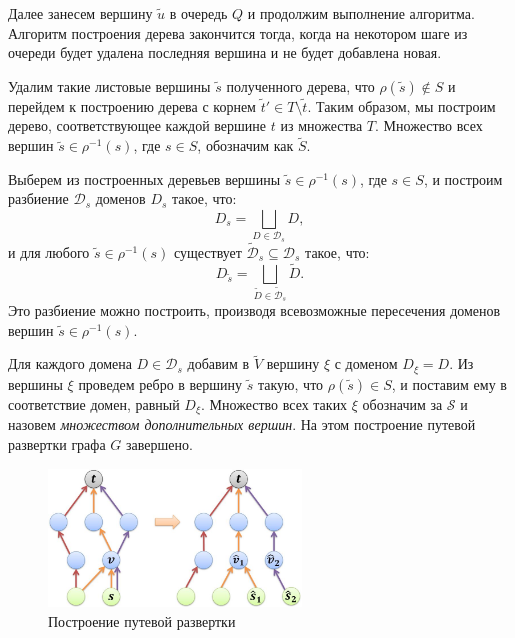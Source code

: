 \documentclass[../thesis.tex]{subfiles}
\begin{document}
Далее занесем вершину $\tilde{u}$ в очередь $Q$ и продолжим выполнение алгоритма.
Алгоритм построения дерева закончится тогда, когда на некотором шаге из очереди будет удалена последняя вершина и не будет добавлена новая.

Удалим такие листовые вершины $\tilde{s}$ полученного дерева, что $\rho(\tilde{s})\notin S$ и перейдем к построению дерева с корнем $\tilde{t}'\in T\setminus{\tilde{t}}$.
Таким образом, мы построим дерево, соответствующее каждой вершине $t$ из множества $T$.
Множество всех вершин $\tilde{s}\in \rho^{-1}(s)$, где $s\in S$, обозначим как $\widetilde{S}$.

Выберем из построенных деревьев вершины $\tilde{s}\in \rho^{-1}(s)$, где $s\in S$, и построим разбиение $\mathscr{D}_s$ доменов $D_s$ такое, что:
\begin{equation}
    D_s = \bigsqcup_{D\in \mathscr{D}_s}{D},
\end{equation}
и для любого $\tilde{s}\in \rho^{-1}(s)$ существует $\widetilde{\mathscr{D}}_s\subseteq \mathscr{D}_s$ такое, что:
\begin{equation}
    D_{\tilde{s}} = \bigsqcup_{\widetilde{D}\in \widetilde{\mathscr{D}}_s} {\widetilde{D}}.
\end{equation}
Это разбиение можно построить, производя всевозможные пересечения доменов вершин $\tilde{s}\in \rho^{-1}(s)$.

Для каждого домена $D\in \mathscr{D}_s$ добавим в $\widetilde{V}$ вершину $\xi$ с доменом $D_{\xi} = D$.
Из вершины $\xi$ проведем ребро в вершину $\tilde{s}$ такую, что $\rho(\tilde{s})\in S$, и поставим ему в соответствие домен, равный $D_{\xi}$.
Множество всех таких $\xi$ обозначим за $\mathscr{S}$ и назовем \textit{множеством дополнительных вершин}.
На этом построение путевой развертки графа $G$ завершено.

\begin{figure}
\centering
\includegraphics[width=0.6\textwidth]{figures/pathscancreation.jpg}
\caption{Построение путевой развертки} \label{fig:pathscancreation}
\end{figure}
\end{document}
